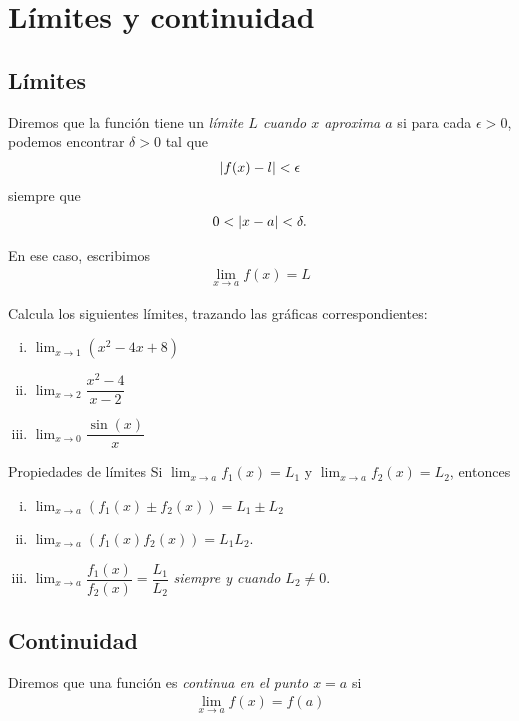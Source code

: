 \section{Límites y continuidad}

\subsection{Límites}

 Diremos que la función tiene un \emph{límite $L$ cuando $x$ aproxima $a$} si para cada $\epsilon >0$, podemos encontrar $\delta >0$ tal que
 \begin{align*}
  \left|f(x)-l\right| < \epsilon
  \end{align*}
siempre que
\begin{align*}
 0 < \left|x-a\right| < \delta.
 \end{align*}

{}
  En ese caso, escribimos
  \begin{align*}
   \lim_{x \to a} f(x) = L
   \end{align*}

{}
  \begin{resuelto}
   Calcula los siguientes límites, trazando las gráficas correspondientes:
   \begin{enumerate}[(i)]
     \item $\lim_{x\to 1}\left( x^{2}-4x+8 \right)$
     \item $\lim_{x\to 2}\dfrac{x^{2}-4}{x-2}$
     \item $\lim_{x\to 0}\dfrac{\sin(x)}{x}$
\end{enumerate}
  \end{resuelto}


{Propiedades de límites}
  Si $\lim_{x \to a}f_{1}(x)= L_{1}$ y $\lim_{x \to a }f_{2}(x)= L_{2}$, entonces
  \begin{enumerate}[(i)]
    \item $\lim_{x\to a}\left( f_{1}(x)\pm f_{2}(x) \right) = L_{1}\pm L_{2}$
    \item $\lim_{x\to a}\left( f_{1}(x) f_{2}(x)\right)= L_{1}L_{2}$.
    \item
    $\lim_{x \to a}\dfrac{f_{1}(x)}{f_{2}(x)} = \dfrac{L_{1}}{L_{2}}$
    \emph{siempre y cuando $L_{2}\neq 0$}.
\end{enumerate}

\subsection{Continuidad}
{}
  Diremos que una función es \emph{continua en el punto $x=a$} si
  \begin{align*}
   \lim_{x\to a} f(x)=f(a)
   \end{align*}

